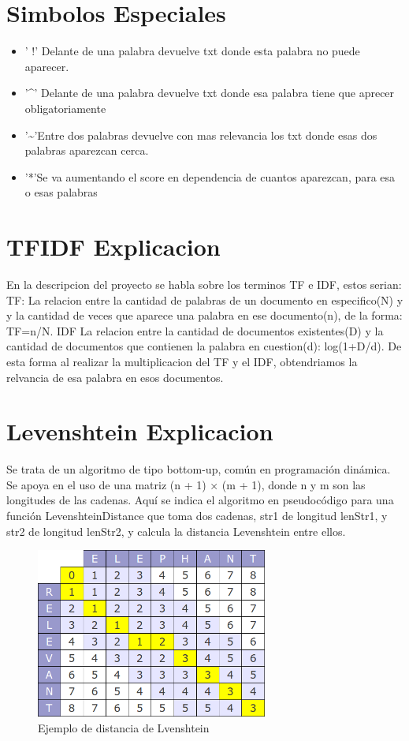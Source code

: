 \documentclass{article}
\begin{document}
\section*{Simbolos Especiales}
\begin{itemize}
    \item ' !' Delante de una palabra devuelve txt donde esta palabra no puede aparecer.
    \item  '\^{}' Delante de una palabra devuelve txt donde esa palabra tiene que aprecer obligatoriamente
    \item  '\~{}'Entre dos palabras devuelve con mas relevancia los txt donde esas dos palabras aparezcan cerca.
    \item   '*'Se va aumentando el score en dependencia de cuantos aparezcan, para esa o esas palabras
\end{itemize}
\section*{TFIDF Explicacion}
En la descripcion del proyecto se habla sobre los terminos TF e IDF, estos serian: TF: La relacion entre la cantidad de palabras de un documento en especifico(N) y y la cantidad de veces que aparece una palabra en ese documento(n), de la forma: TF=n/N. IDF La relacion entre la cantidad de documentos existentes(D) y la cantidad de documentos que contienen la palabra en cuestion(d): log(1+D/d). De esta forma al realizar la multiplicacion del TF y el IDF, obtendriamos la relvancia de esa palabra en esos documentos.
\section*{Levenshtein Explicacion}
Se trata de un algoritmo de tipo bottom-up, común en programación dinámica. Se apoya en el uso de una matriz (n + 1) × (m + 1), donde n y m son las longitudes de las cadenas. Aquí se indica el algoritmo en pseudocódigo para una función LevenshteinDistance que toma dos cadenas, str1 de longitud lenStr1, y str2 de longitud lenStr2, y calcula la distancia Levenshtein entre ellos.
\begin{figure}[h]
    \centering
	\includegraphics[width=0.68\textwidth]{diagrama.png}
    \caption{Ejemplo de distancia de Lvenshtein}
    \label{img:3}
\end{figure}
\end{document}
